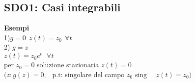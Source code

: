 \documentclass{article}
\begin{document}
\subsection{SDO1: Casi integrabili}
\textbf{Esempi}\\
1)$g = 0 \ \ z(t) = z_0 \ \ \forall t$\\
2) $g = z$\\
$z(t) = z_0 e^t \ \ \ \forall t$\\
per $z_0 = 0$ soluzione stazionaria $z(t) = 0$\\
 $(z: g(z) = 0, \ \ $ p.t: singolare del campo $z_0$ sing \ \ $z(t) = z_0) $


\maketitle
	\newpage
\end{document}
